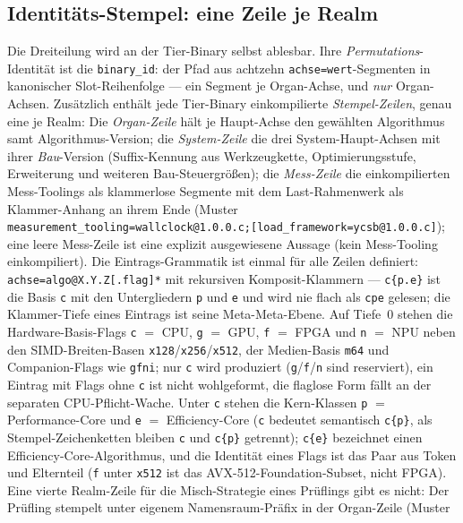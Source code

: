 \begin{nurkurz}
\subsection{Identitäts-Stempel: eine Zeile je Realm}\label{sec:stamp-model}
Die Dreiteilung wird an der Tier-Binary selbst ablesbar. Ihre \emph{Permutations}-Identität ist die
\texttt{binary\_id}: der Pfad aus achtzehn \texttt{achse=wert}-Segmenten in kanonischer Slot-Reihenfolge --- ein
Segment je Organ-Achse, und \emph{nur} Organ-Achsen. Zusätzlich enthält jede Tier-Binary einkompilierte
\emph{Stempel-Zeilen}, genau eine je Realm: Die \emph{Organ-Zeile} hält je Haupt-Achse den gewählten
Algorithmus samt Algorithmus-Version; die \emph{System-Zeile} die drei System-Haupt-Achsen mit ihrer
\emph{Bau}-Version (Suffix-Kennung aus Werkzeugkette, Optimierungsstufe, Erweiterung und weiteren
Bau-Steuergrößen); die \emph{Mess-Zeile} die einkompilierten Mess-Toolings als klammerlose Segmente mit dem
Last-Rahmenwerk als Klammer-Anhang an ihrem Ende (Muster
\texttt{measurement\_tooling=wallclock@1.0.0.c;\allowbreak{}[load\_framework=ycsb@1.0.0.c]}); eine leere
Mess-Zeile ist eine explizit ausgewiesene Aussage (kein Mess-Tooling einkompiliert). Die Eintrags-Grammatik ist
einmal für alle Zeilen definiert: \texttt{achse=algo@X.Y.Z[.flag]*} mit rekursiven Komposit-Klammern ---
\texttt{c\{p.e\}} ist die Basis \texttt{c} mit den Untergliedern \texttt{p} und \texttt{e} und wird nie flach
als \texttt{cpe} gelesen; die Klammer-Tiefe eines Eintrags ist seine Meta-Meta-Ebene. Auf Tiefe~0 stehen
die Hardware-Basis-Flags \texttt{c} $=$ CPU, \texttt{g} $=$ GPU, \texttt{f} $=$ FPGA und \texttt{n} $=$ NPU
neben den SIMD-Breiten-Basen \texttt{x128}/\texttt{x256}/\texttt{x512}, der Medien-Basis \texttt{m64} und
Companion-Flags wie \texttt{gfni}; nur \texttt{c} wird produziert (\texttt{g}/\texttt{f}/\texttt{n} sind
reserviert), ein Eintrag mit Flags ohne \texttt{c} ist nicht wohlgeformt, die flaglose Form fällt an der
separaten CPU-Pflicht-Wache. Unter \texttt{c} stehen die Kern-Klassen \texttt{p} $=$ Performance-Core und
\texttt{e} $=$ Efficiency-Core (\texttt{c} bedeutet semantisch \texttt{c\{p\}}, als Stempel-Zeichenketten
bleiben \texttt{c} und \texttt{c\{p\}} getrennt); \texttt{c\{e\}} bezeichnet einen
Efficiency-Core-Algorithmus, und die Identität eines Flags ist das Paar aus Token und Elternteil (\texttt{f}
unter \texttt{x512} ist das AVX-512-Foundation-Subset, nicht FPGA). Eine vierte Realm-Zeile für die Misch-Strategie eines Prüflings
gibt es nicht: Der Prüfling stempelt unter eigenem Namensraum-Präfix in der Organ-Zeile (Muster

\end{nurkurz}
